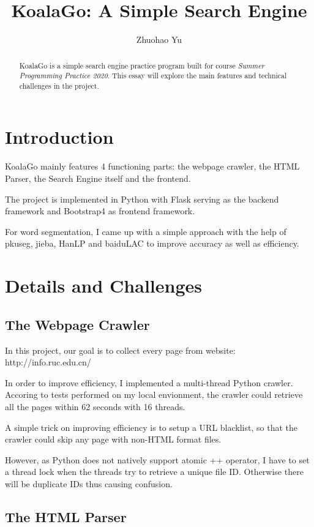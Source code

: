 \documentclass[a4paper]{article}
\title{KoalaGo: A Simple Search Engine}
\author{Zhuohao Yu}
\begin{document}
\maketitle

\begin{abstract}
KoalaGo is a simple search engine practice program built for course \emph{Summer Programming Practice 2020}. This essay will explore the main features and technical challenges in the project.
\end{abstract}

\section{Introduction}

KoalaGo mainly features 4 functioning parts: the webpage crawler, the HTML Parser, the Search Engine itself and the frontend.

The project is implemented in Python with Flask serving as the backend framework and Bootstrap4 as frontend framework.

For word segmentation, I came up with a simple approach with the help of pkuseg, jieba, HanLP and baiduLAC to improve accuracy as well as efficiency.

\section{Details and Challenges}

\subsection{The Webpage Crawler}

In this project, our goal is to collect every page from website: http://info.ruc.edu.cn/

In order to improve efficiency, I implemented a multi-thread Python crawler. Accoring to tests performed on my local envionment, the crawler could retrieve all the pages within 62 seconds with 16 threads.

A simple trick on improving efficiency is to setup a URL blacklist, so that the crawler could skip any page with non-HTML format files.

However, as Python does not natively support atomic ++ operator, I have to set a thread lock when the threads try to retrieve a unique file ID. Otherwise there will be duplicate IDs thus causing confusion.


\subsection{The HTML Parser}
\end{document}
